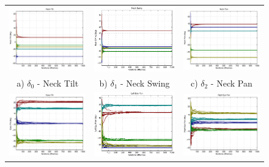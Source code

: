 \begin{figure}
\centering
\begin{tabular}{ccc}
 \includegraphics[width=0.32\linewidth]{images/results/neck_tilt_offsets_sim} &  
 \includegraphics[width=0.32\linewidth]{images/results/neck_swing_offsets_sim} &
 \includegraphics[width=0.32\linewidth]{images/results/neck_pan_offsets_sim} \\
  a) $\delta_0$ - Neck Tilt & b) $\delta_1$ - Neck Swing & c) $\delta_2$ - Neck Pan \\
 \includegraphics[width=0.32\linewidth]{images/results/eyes_tilt_offsets_sim} &
 \includegraphics[width=0.32\linewidth]{images/results/left_eye_pan_offsets_sim} & 
 \includegraphics[width=0.32\linewidth]{images/results/right_eye_pan_offsets_sim}\\

\end{tabular}
\end{figure}
